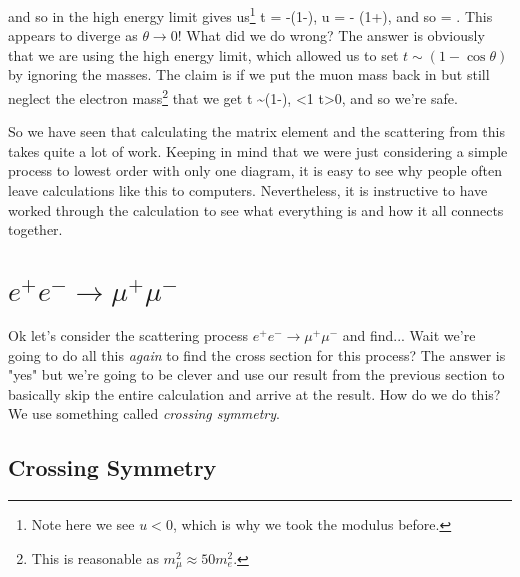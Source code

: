 \ese
and so  in the high energy limit gives us\footnote{Note here we see $u<0$, which is why we took the modulus before.} 
\bse 
    t = -\big(1-\cos\theta), \qand u = - \big(1+\cos\theta),
\ese 
and so 
\bse 
     =  .
\ese 
This appears to diverge as $\theta\to 0$! What did we do wrong? The answer is obviously that we are using the high energy limit, which allowed us to set $t\sim (1-\cos\theta)$ by ignoring the masses. The claim is if we  put the muon mass back in but still neglect the electron mass\footnote{This is reasonable as $m_{\mu}^2 \approx 50 m_e^2$.} that we get 
\bse 
    t \sim (1-\beta\cos\theta), \qquad \beta <1 \qquad \implies \qquad t>0,
\ese 
and so we're safe.

So we have seen that calculating the matrix element and the scattering from this takes quite a lot of work. Keeping in mind that we were just considering a simple process to lowest order with only one diagram, it is easy to see why people often leave calculations like this to computers. Nevertheless, it is instructive to have worked through the calculation to see what everything is and how it all connects together. 

\section{$e^+e^-\to \mu^+\mu^-$}

Ok let's consider the scattering process $e^+e^-\to \mu^+\mu^-$ and find... Wait we're going to do all this \textit{again} to find the cross section for this process? The answer is "yes" but we're going to be clever and use our result from the previous section to basically skip the entire calculation and arrive at the result. How do we do this? We use something called \textit{crossing symmetry}. 

\subsection{Crossing Symmetry}

